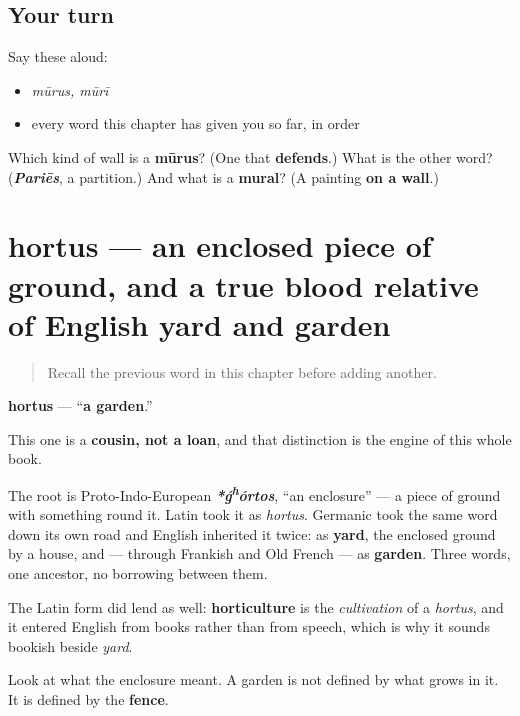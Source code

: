 \subsection*{Your turn}
Say these aloud:

\begin{itemize}
\raggedright
  \item \emph{mūrus, mūrī}
  \item every word this chapter has given you so far, in order
\end{itemize}

\begin{tcolorbox}[breakable,colback=teal!4,colframe=teal!35!black,title={Before you move on}]
Which kind of wall is a \textbf{mūrus}? (One that \textbf{defends}.) What is the other word? (\emph{\textbf{Pariēs}}, a partition.) And what is a \textbf{mural}? (A painting \textbf{on a wall}.)
\end{tcolorbox}
\section[hortus, hortī]{hortus — an enclosed piece of ground, and a true blood relative of English yard and garden}

\label{lesson:LA-C44-hortus}



\begin{quote}
Recall the previous word in this chapter before adding another.
\end{quote}

\begin{cousinweb}
\textbf{hortus} — \textquotedblleft{}\textbf{a garden}.\textquotedblright{}

This one is a \textbf{cousin, not a loan}, and that distinction is the engine of this whole book.

The root is Proto-Indo-European \emph{\textbf{*ǵ\textsuperscript{h}órtos}}, \textquotedblleft{}an enclosure\textquotedblright{} — a piece of ground with something round it. Latin took it as \emph{hortus}. Germanic took the same word down its own road and English inherited it twice: as \textbf{yard}, the enclosed ground by a house, and — through Frankish and Old French — as \textbf{garden}. Three words, one ancestor, no borrowing between them.

The Latin form did lend as well: \textbf{horticulture} is the \emph{cultivation} of a \emph{hortus}, and it entered English from books rather than from speech, which is why it sounds bookish beside \emph{yard}.

Look at what the enclosure meant. A garden is not defined by what grows in it. It is defined by the \textbf{fence}.
\end{cousinweb}


